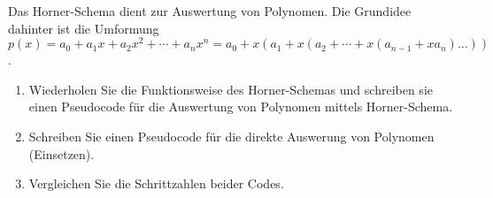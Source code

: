 
\begin{exercise}

Das Horner-Schema dient zur Auswertung von Polynomen.
Die Grundidee dahinter ist die Umformung $p(x) = a_0 + a_1 x + a_2 x^2 + \cdots + a_n x^n = a_0 + x (a_1 + x (a_2 + \cdots + x (a_{n - 1} + x a_n) \ldots))$.

\begin{enumerate}[label = (\roman*)]
    \item Wiederholen Sie die Funktionsweise des Horner-Schemas und schreiben sie einen Pseudocode für die Auswertung von Polynomen mittels Horner-Schema.
    \item Schreiben Sie einen Pseudocode für die direkte Auswerung von Polynomen (Einsetzen).
    \item Vergleichen Sie die Schrittzahlen beider Codes.
\end{enumerate}

\end{exercise}


